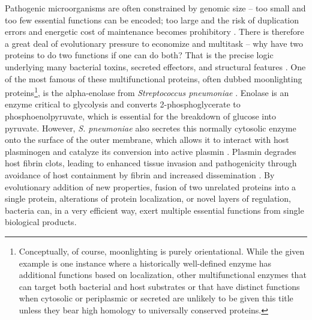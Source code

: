 Pathogenic microorganisms are often constrained by genomic size -- too small and too few essential functions can be encoded; too large and the risk of duplication errors and energetic cost of maintenance becomes prohibitory \citep{Ranea2005, Bobay2017, Huberts2010}. There is therefore a great deal of evolutionary pressure to economize and multitask -- why have two proteins to do two functions if one can do both? That is the precise logic underlying many bacterial toxins, secreted effectors, and structural features \citep{Gupta2019}. One of the most famous of these multifunctional proteins, often dubbed moonlighting proteins\footnote{Conceptually, of course, moonlighting is purely orientational. While the given example is one instance where a historically well\hyp{}defined enzyme has additional functions based on localization, other multifunctional enzymes that can target both bacterial and host substrates or that have distinct functions when cytosolic or periplasmic or secreted are unlikely to be given this title unless they bear high homology to universally conserved proteins.}, is the alpha\hyp{}enolase from \textit{Streptococcus pneumoniae} \citep{Bergmann2001}. Enolase is an enzyme critical to glycolysis and converts 2\hyp{}phosphoglycerate to phosphoenolpyruvate, which is essential for the breakdown of glucose into pyruvate. However, \textit{S. pneumoniae} also secretes this normally cytosolic enzyme onto the surface of the outer membrane, which allows it to interact with host plasminogen and catalyze its conversion into active plasmin \citep{Bergmann2013}. Plasmin degrades host fibrin clots, leading to enhanced tissue invasion and pathogenicity through avoidance of host containment by fibrin and increased dissemination \citep{Whiting2002, Weiser2018}. By evolutionary addition of new properties, fusion of two unrelated proteins into a single protein, alterations of protein localization, or novel layers of regulation, bacteria can, in a very efficient way, exert multiple essential functions from single biological products.

